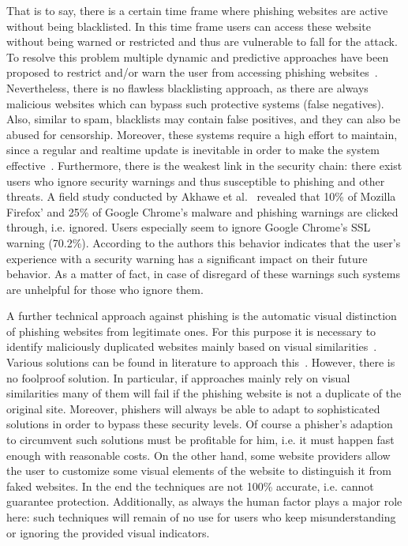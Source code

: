 \begin{description}[leftmargin=0cm]
 That is to say, there is a certain time frame where phishing websites are active without being blacklisted.
 In this time frame users can access these website without being warned or restricted and thus are vulnerable to fall for the attack.
 To resolve this problem multiple dynamic and predictive approaches have been proposed to restrict and/or warn the user from accessing phishing websites~\cite{prakash2010phishnet, obied2009fraudulent, balzarotti2012proactive}. Nevertheless, there is no flawless blacklisting approach, as there are always malicious websites which can bypass such protective systems (false negatives). Also, similar to spam, blacklists may contain false positives, and they can also be abused for censorship.
 Moreover, these systems require a high effort to maintain, since a regular and realtime update is inevitable in order to make the system effective~\cite{purkait2012phishing}. Furthermore, there is the weakest link in the security chain: there exist users who ignore security warnings and thus susceptible to phishing and other threats.
A field study conducted by Akhawe et al.~\cite{akhawe2013alice} revealed that 10\% of Mozilla Firefox' and 25\% of Google Chrome's malware and phishing warnings are clicked through, i.e. ignored.
Users especially seem to ignore Google Chrome's SSL warning (70.2\%). According to the authors this behavior indicates that the user's experience with a security warning has a significant impact on their future behavior.
 As a matter of fact, in case of disregard of these warnings such systems are unhelpful for those who ignore them. 
	\item[Visual distinction.] A further technical approach against phishing is the automatic visual distinction of phishing websites from legitimate ones.
 For this purpose it is necessary to identify maliciously duplicated websites mainly based on visual similarities~\cite{liu2006antiphishing}. Various solutions can be found in literature to approach this~\cite{chen2009fighting,chen2010detecting,zhang2011textual}. However, there is no foolproof solution.
 In particular, if approaches mainly rely on visual similarities many of them will fail if the phishing website is not a duplicate of the original site.
 Moreover, phishers will always be able to adapt to sophisticated solutions in order to bypass these security levels. 
Of course a phisher's adaption to circumvent such solutions must be profitable for him, i.e. it must happen fast enough with reasonable costs.
On the other hand, some website providers allow the user to customize some visual elements of the website to distinguish it from faked websites.
In the end the techniques are not 100\% accurate, i.e. cannot guarantee protection. 
Additionally, as always the human factor plays a major role here: such techniques will remain of no use for users who keep misunderstanding or ignoring the provided visual indicators.


\end{description}
